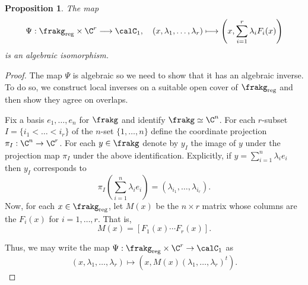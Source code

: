 \documentclass[12pt, a4paper, oneside]{amsart}
\theoremstyle{plain} %
\newtheorem{proposition}[theorem]{Proposition}
\theoremstyle{definition} %
\theoremstyle{remark} %
\begin{document}
\begin{proposition}\label{prop:Liealgbihol}
The map 
\[\Psi:\frakg_{\rm reg}\times \C^r \longrightarrow \calC_1,\quad (x,\lambda_1,\dots, \lambda_r) \longmapsto \left(x,\sum_{i=1}^r\lambda_i F_i(x)\right)\]
is an algebraic isomorphism. 
\end{proposition}

\begin{proof}
The map $\Psi$ is algebraic so we need to show that it has an algebraic inverse. To do so, we construct local inverses on a suitable open cover of $\frakg_{\rm reg}$ and then show they agree on overlaps.

\medskip

Fix a basis $e_1,\dots,e_n$ for $\frakg$ and identify $\frakg\simeq \C^n$. For each $r$-subset $I=\{i_1< \dots < i_r\}$ of the $n$-set $\{1,\dots, n\}$ define the coordinate projection $\pi_I:\C^n \to \C^r$. For each $y\in\frakg$ denote by $y_I$ the image of $y$ under the projection map $\pi_I$ under the above identification. Explicitly, if $y=\sum_{i=1}^n\lambda_ie_i$ then $y_I$ corresponds to
\[\pi_I\left(\sum_{i=1}^n \lambda_i e_i\right) = (\lambda_{i_1},\dots, \lambda_{i_r}).\]
Now, for each $x\in \frakg_{\rm reg}$, let $M(x)$ be the $n\times r$ matrix whose columns are the $F_i(x)$ for $i=1,\dots, r$. That is, 
\[M(x) = [F_1(x)\cdots F_r(x)].\]

Thus, we may write the map $\Psi:\frakg_{\rm reg}\times \C^r\to \calC_1$ as 
\[(x,\lambda_1,\dots,\lambda_r)\longmapsto (x,M(x)(\lambda_1,\dots,\lambda_r)^t).\] 


\end{proof}
\end{document}
